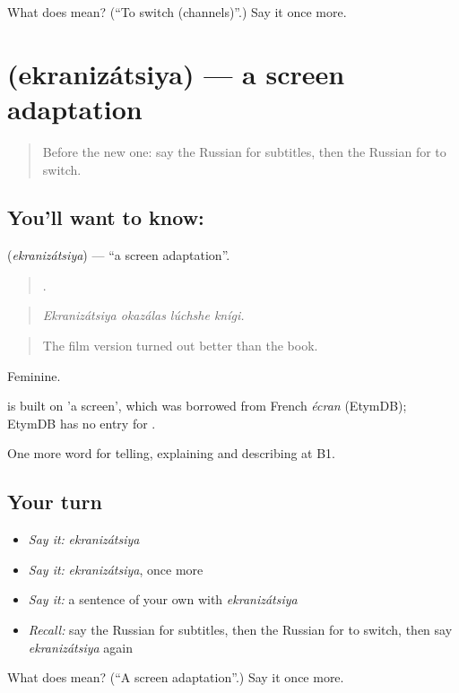 \begin{tcolorbox}[breakable,colback=teal!4,colframe=teal!35!black,title={Before you move on}]
What does  mean? (\textquotedblleft{}To switch (channels)\textquotedblright{}.) Say it once more.
\end{tcolorbox}
\section[\texorpdfstring{\ru{экранизация} (ekranizátsiya)}{экранизация (ekranizátsiya)}]{ (ekranizátsiya) — a screen adaptation}

\label{lesson:RU-C527-ekranizatsiya}



\begin{quote}
Before the new one: say the Russian for subtitles, then the Russian for to switch.
\end{quote}

\subsection*{You'll want to know: }
\textbf{} (\emph{ekranizátsiya}) — \textquotedblleft{}a screen adaptation\textquotedblright{}.

\begin{quote}
   .
\end{quote}

\begin{quote}
\emph{Ekranizátsiya okazálas lúchshe knígi.}
\end{quote}

\begin{quote}
The film version turned out better than the book.
\end{quote}

Feminine.

\begin{cousinweb}
\emph{} is built on \emph{} 'a screen', which was borrowed from French \emph{écran} (EtymDB); EtymDB has no entry for \emph{}.
\end{cousinweb}

\begin{grammarlens}[title={What you've built}]
One more word for telling, explaining and describing at B1.
\end{grammarlens}

\subsection*{Your turn}
\begin{itemize}
\raggedright
  \item \emph{Say it:} \emph{ekranizátsiya}
  \item \emph{Say it:} \emph{ekranizátsiya}, once more
  \item \emph{Say it:} a sentence of your own with \emph{ekranizátsiya}
  \item \emph{Recall:} say the Russian for subtitles, then the Russian for to switch, then say \emph{ekranizátsiya} again
\end{itemize}

\begin{tcolorbox}[breakable,colback=teal!4,colframe=teal!35!black,title={Before you move on}]
What does  mean? (\textquotedblleft{}A screen adaptation\textquotedblright{}.) Say it once more.
\end{tcolorbox}
